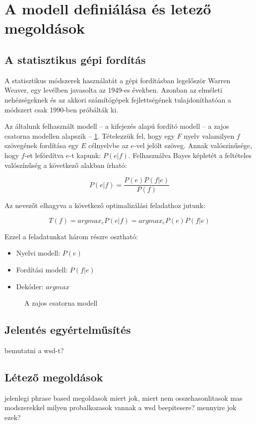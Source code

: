 \section{A modell definiálása és letező megoldások} \label{sec:model_definition}

\subsection{A statisztikus gépi fordítás}

A statisztikus módszerek használatát a gépi fordításban legelőször Warren Weaver, egy levélben javasolta az 1949-es években. Azonban az elméleti nehézségeknek és az akkori számítógépek fejlettségének tulajdoníthatóan a módszert csak 1990-ben próbálták ki.

Az általunk felhasznált modell -- a kifejezés alapú fordító modell -- a zajos csatorna modellen alapszik -- \ref{fig:modell:fig1}. Tételezzük fel, hogy egy $F$ nyelv valamilyen $f$ szövegének fordítása egy $E$ célnyelvbe az $e$-vel jelölt szöveg. Annak valószínűsége, hogy $f$-et lefórdítva $e$-t kapunk: $P(e|f)$. Felhasználva Bayes képletét a feltételes valószínűség a következő alakban írható:

\begin{equation}
	P(e|f) = \frac{P(e)P(f|e)}{P(f)}
\end{equation}

Az nevezőt elhagyva a következő optimalizálási feladathoz jutunk:

\begin{equation}
	T(f) = argmax_e P(e|f) = argmax_e P(e)P(f|e)
\end{equation} 

Ezzel a feladatunkat három részre osztható: 
\begin{itemize}
	\item
		Nyelvi modell: $P(e)$
	\item
		Fordítási modell: $P(f|e)$
	\item
		Dekóder: $argmax$
\end{itemize}














\begin{figure}[b]
  	\centering
  	\caption[smt_translation_model]%
  	{A zajos csatorna modell}
 	\label{fig:modell:fig1}
\end{figure}





\subsection{Jelentés egyértelműsítés}
bemutatni a wsd-t?

\subsection{Létező megoldások}
jelenlegi phrase based megoldasok
	miert jok, miert nem
	osszehasonlitasok mas modszerekkel
milyen probalkozasok vannak a wsd beepitesere?
mennyire jok ezek?